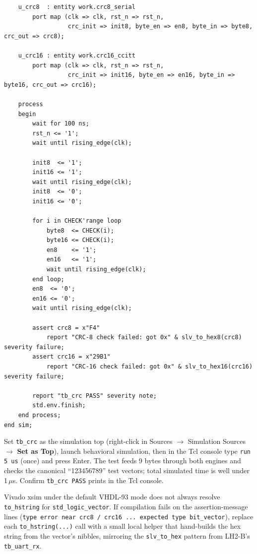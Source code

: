 \documentclass[11pt,letterpaper]{article}
\begin{document}
\begin{lstlisting}
    u_crc8  : entity work.crc8_serial
        port map (clk => clk, rst_n => rst_n,
                  crc_init => init8, byte_en => en8, byte_in => byte8, crc_out => crc8);

    u_crc16 : entity work.crc16_ccitt
        port map (clk => clk, rst_n => rst_n,
                  crc_init => init16, byte_en => en16, byte_in => byte16, crc_out => crc16);

    process
    begin
        wait for 100 ns;
        rst_n <= '1';
        wait until rising_edge(clk);

        init8  <= '1';
        init16 <= '1';
        wait until rising_edge(clk);
        init8  <= '0';
        init16 <= '0';

        for i in CHECK'range loop
            byte8  <= CHECK(i);
            byte16 <= CHECK(i);
            en8    <= '1';
            en16   <= '1';
            wait until rising_edge(clk);
        end loop;
        en8  <= '0';
        en16 <= '0';
        wait until rising_edge(clk);

        assert crc8 = x"F4"
            report "CRC-8 check failed: got 0x" & slv_to_hex8(crc8) severity failure;
        assert crc16 = x"29B1"
            report "CRC-16 check failed: got 0x" & slv_to_hex16(crc16) severity failure;

        report "tb_crc PASS" severity note;
        std.env.finish;
    end process;
end sim;
\end{lstlisting}

Set \texttt{tb\_crc} as the simulation top (right-click in Sources $\to$ Simulation Sources $\to$ \textbf{Set as Top}), launch behavioral simulation, then in the Tcl console type \texttt{run 5 us} (once) and press Enter. The test feeds 9 bytes through both \CRC{} engines and checks the canonical \mbox{``123456789''} test vectors; total simulated time is well under 1\,$\mu$s. Confirm \texttt{tb\_crc PASS} prints in the Tcl console.

\begin{tcolorbox}[infobox={\texttt{to\_hstring} portability note}]
Vivado xsim under the default VHDL-93 mode does not always resolve \texttt{to\_hstring} for \texttt{std\_logic\_vector}. If compilation fails on the assertion-message lines (\texttt{type error near crc8 / crc16 ... expected type bit\_vector}), replace each \texttt{to\_hstring(...)} call with a small local helper that hand-builds the hex string from the vector's nibbles, mirroring the \texttt{slv\_to\_hex} pattern from LH2-B's \texttt{tb\_uart\_rx}.
\end{tcolorbox}
\end{document}
